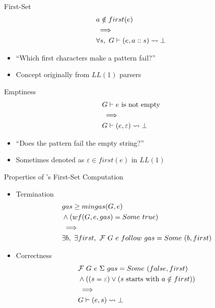 \documentclass{beamer}
\begin{document}
\begin{frame}{First-Set}
    \begin{align*}
        & \text{$a \notin first(e)$} \\
        & \implies \\
        & \forall s,\ G \vdash (e, a::s) \rightsquigarrow \bot
    \end{align*}
    \begin{itemize}
        \item ``Which first characters make a pattern fail?''
        \item Concept originally from $LL(1)$ parsers
    \end{itemize}
\end{frame}

\begin{frame}{Emptiness}
    \begin{align*}
        & \text{$G \vdash e$ is not empty} \\
        & \implies \\
        & G \vdash (e, \varepsilon) \rightsquigarrow \bot
    \end{align*}
    \begin{itemize}
        \item ``Does the pattern fail the empty string?''
        \item Sometimes denoted as $\varepsilon \in first(e)$ in $LL(1)$
    \end{itemize}
\end{frame}

\begin{frame}{Properties of \lpeg{}'s First-Set Computation}
    \begin{itemize}
        \item Termination
        \begin{align*}
            & gas \ge mingas(G, e) \\
            & \wedge (wf(G, e, gas) = \Some true) \\
            & \implies \\
            & \exists b,\ \exists first,\ \firstcomp{G}{e}{follow}{gas} = \Some (b, first)
        \end{align*}
        \item Correctness
        \begin{align*}
            & \mathcal{F}{}\ G\ e\ \Sigma\ gas = Some\ (false, first) \\
            & \wedge ((s = \varepsilon) \vee (\text{$s$ starts with $a \notin first$})) \\
            & \implies \\
            & G \vdash (e, s) \rightsquigarrow \bot
        \end{align*}
    \end{itemize}
\end{frame}
\end{document}
